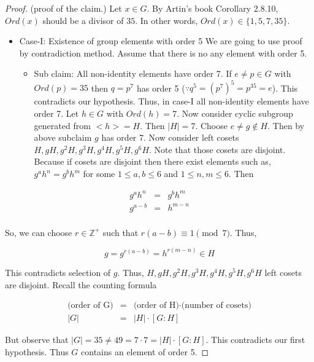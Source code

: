 \documentclass[
]{book}
\providecommand{\tightlist}{%
  \setlength{\itemsep}{0pt}\setlength{\parskip}{0pt}}
\theoremstyle{definition}
\theoremstyle{definition}
\theoremstyle{definition}
\theoremstyle{definition}
\theoremstyle{remark}
\begin{document}
\begin{proof}

(proof of the claim.)
Let \(x \in G\). By Artin's book Corollary 2.8.10, \(Ord(x)\) should be a divisor of \(35\).
In other words, \(Ord(x) \in \{1,5,7,35\}\).

\begin{itemize}
\tightlist
\item
  Case-I: Existence of group elements with order 5
  We are going to use proof by contradiction method.
  Assume that there is no any element with order 5.

  \begin{itemize}
  \tightlist
  \item
    Sub claim:
    All non-identity elements have order 7.
    If \(e \neq p \in G\) with \(Ord(p) = 35\) then \(q = p^7\) has order 5 (\(\because q^5 = (p^{7})^5 = p^35 = e\)).
    This contradicts our hypothesis. Thus, in case-I all non-identity elements have order 7.
    Let \(h \in G\) with \(Ord(h) = 7\). Now consider cyclic subgroup generated from \(<h> = H\).
    Then \(|H| = 7\). Choose \(e \neq g \not \in H\).
    Then by above subclaim \(g\) has order 7.
    Now consider left cosets \(H, gH, g^2H, g^3H, g^4H, g^5H, g^6H\).
    Note that those cosets are disjoint.
    Because if cosets are disjoint then there exist elements such as,
    \(g^ah^n = g^bh^m\) for some \(1 \leq a, b \leq 6\) and \(1 \leq n, m \leq 6\). Then
  \end{itemize}
\end{itemize}

\begin{eqnarray*}
    g^ah^n &=& g^bh^m \\
    g^{a-b} &=& h^{m-n} \\
\end{eqnarray*}

So, we can choose \(r \in \mathbb{Z}^+\) such that \(r(a-b) \equiv 1 \pmod{7}\).
Thus,

\[
g = g^{r(a-b)} = h^{r(m-n)} \in H
\]

This contradicts selection of \(g\).
Thus, \(H, gH, g^2H, g^3H, g^4H, g^5H, g^6H\) left cosets are disjoint.
Recall the counting formula

\begin{eqnarray*}
\text{(order of G)} &=& \text{(order of H)} \cdot \text{(number of cosets)} \\
|G| &=& |H| \cdot [G:H]
\end{eqnarray*}

But observe that \(|G| = 35 \neq 49 = 7 \cdot 7 = |H| \cdot [G:H]\).
This contradicts our first hypothesis.
Thus \(G\) contains an element of order 5.


\end{proof}
\end{document}
